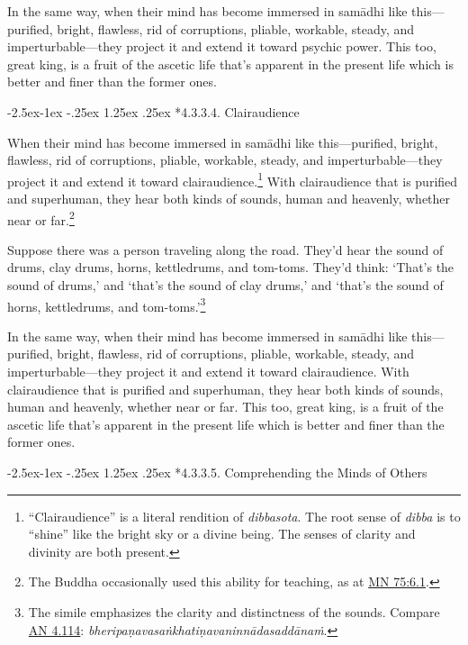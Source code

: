\documentclass[12pt,openany]{book}%
\makeatletter
\renewcommand\paragraph{\@startsection{paragraph}{4}{\z@}%
            {-2.5ex\@plus -1ex \@minus -.25ex}%
            {1.25ex \@plus .25ex}%
            {\noindent\normalfont\itshape\small}}
\makeatother
\begin{document}
In the same way, when their mind has become immersed in \textsanskrit{samādhi} like this—purified, bright, flawless, rid of corruptions, pliable, workable, steady, and imperturbable—they project it and extend it toward psychic power. This too, great king, is a fruit of the ascetic life that’s apparent in the present life which is better and finer than the former ones. 

\paragraph*{4.3.3.4. Clairaudience }

When their mind has become immersed in \textsanskrit{samādhi} like this—purified, bright, flawless, rid of corruptions, pliable, workable, steady, and imperturbable—they project it and extend it toward clairaudience.\footnote{“Clairaudience” is a literal rendition of \textit{dibbasota}. The root sense of \textit{dibba} is to “shine” like the bright sky or a divine being. The senses of clarity and divinity are both present. } With clairaudience that is purified and superhuman, they hear both kinds of sounds, human and heavenly, whether near or far.\footnote{The Buddha occasionally used this ability for teaching, as at \href{https://suttacentral.net/mn75/en/sujato\#6.1}{MN 75:6.1}. } 

Suppose there was a person traveling along the road. They’d hear the sound of drums, clay drums, horns, kettledrums, and tom-toms. They’d think: ‘That’s the sound of drums,’ and ‘that’s the sound of clay drums,’ and ‘that’s the sound of horns, kettledrums, and tom-toms.’\footnote{The simile emphasizes the clarity and distinctness of the sounds. Compare \href{https://suttacentral.net/an4.114/en/sujato}{AN 4.114}: \textit{\textsanskrit{bheripaṇavasaṅkhatiṇavaninnādasaddānaṁ}}. } 

In the same way, when their mind has become immersed in \textsanskrit{samādhi} like this—purified, bright, flawless, rid of corruptions, pliable, workable, steady, and imperturbable—they project it and extend it toward clairaudience. With clairaudience that is purified and superhuman, they hear both kinds of sounds, human and heavenly, whether near or far. This too, great king, is a fruit of the ascetic life that’s apparent in the present life which is better and finer than the former ones. 

\paragraph*{4.3.3.5. Comprehending the Minds of Others }
\end{document}
